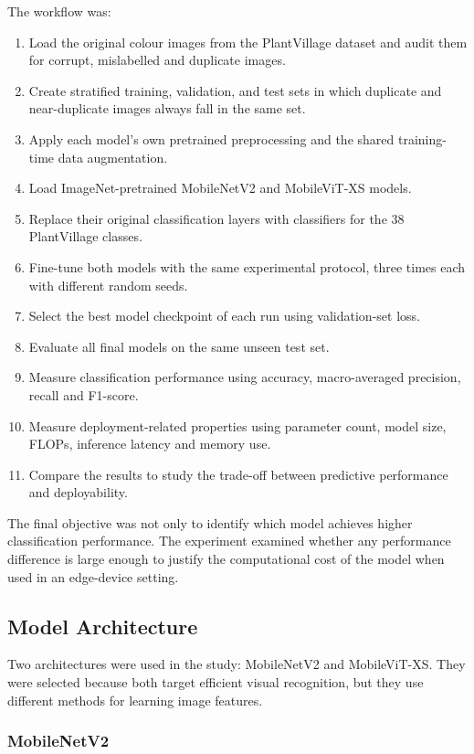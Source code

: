 \documentclass[conference]{IEEEtran}
\begin{document}
The workflow was:
\begin{enumerate}
    \item Load the original colour images from the PlantVillage dataset and audit them for corrupt, mislabelled and duplicate images.
    \item Create stratified training, validation, and test sets in which duplicate and near-duplicate images always fall in the same set.
    \item Apply each model's own pretrained preprocessing and the shared training-time data augmentation.
    \item Load ImageNet-pretrained MobileNetV2 and MobileViT-XS models.
    \item Replace their original classification layers with classifiers for the 38 PlantVillage classes.
    \item Fine-tune both models with the same experimental protocol, three times each with different random seeds.
    \item Select the best model checkpoint of each run using validation-set loss.
    \item Evaluate all final models on the same unseen test set.
    \item Measure classification performance using accuracy, macro-averaged precision, recall and F1-score.
    \item Measure deployment-related properties using parameter count, model size, FLOPs, inference latency and memory use.
    \item Compare the results to study the trade-off between predictive performance and deployability.
\end{enumerate}

The final objective was not only to identify which model achieves higher classification performance. The experiment examined whether any performance difference is large enough to justify the computational cost of the model when used in an edge-device setting.

\subsection{Model Architecture}

Two architectures were used in the study: MobileNetV2 and MobileViT-XS. They were selected because both target efficient visual recognition, but they use different methods for learning image features.

\subsubsection{MobileNetV2}
\end{document}
